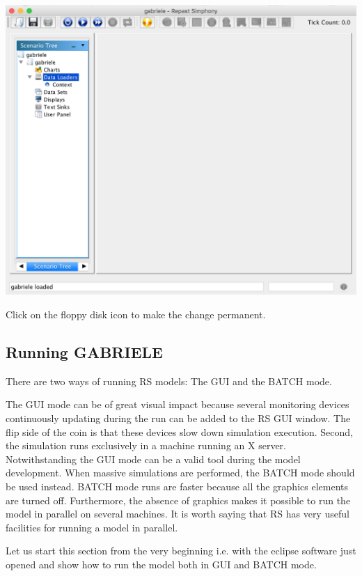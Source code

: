 \documentclass{book}
\begin{document}
\noindent
\includegraphics[scale=0.35]{fig_gabriele_rs_gui6}

Click on the floppy disk icon to make the change permanent.




\subsection{Running GABRIELE}


There are two ways of running RS models: The GUI and the BATCH mode.

The GUI mode can be of great visual impact because several monitoring devices continuously updating during the run can be added to the RS GUI window. The flip side of the coin is that these devices slow down simulation execution. Second, the simulation runs exclusively in a machine running an X server. Notwithstanding the GUI mode can be a valid tool during the model development. When massive simulations are performed, the BATCH mode should be used instead. BATCH mode runs are faster because all the graphics elements are turned off. Furthermore, the absence of graphics makes it possible to run the model in parallel on several machines. It is worth saying that RS has very useful facilities for running a model in parallel.


Let us start this section from the very beginning i.e. with the eclipse software just opened and show how to run the model both in GUI and BATCH mode.
\end{document}
